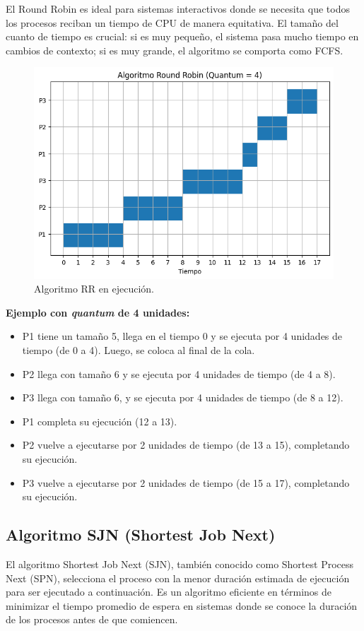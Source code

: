 El Round Robin es ideal para sistemas interactivos donde se necesita que todos los procesos reciban un tiempo de CPU de manera equitativa. El tamaño del cuanto de tiempo es crucial: si es muy pequeño, el sistema pasa mucho tiempo en cambios de contexto; si es muy grande, el algoritmo se comporta como FCFS.
\begin{figure}[H] \centering \includegraphics[width=0.8\linewidth]{Imagenes/rr_ejecucion.png} 
	\caption{Algoritmo RR en ejecución.} 
\end{figure}

\textbf{Ejemplo con \textit{quantum} de 4 unidades:}
\begin{itemize}
	\item 
	P1 tiene un tamaño 5, llega en el tiempo 0 y se ejecuta por 4 unidades de tiempo (de 0 a 4). Luego, se coloca al final de la cola.
	\item 	P2 llega con tamaño 6 y se ejecuta por 4 unidades de tiempo (de 4 a 8).
	\item 	P3 llega con tamaño 6, y se ejecuta por 4 unidades de tiempo (de 8 a 12).
	\item 	
	P1 completa su ejecución (12 a 13).
	\item P2 vuelve a ejecutarse por 2 unidades de tiempo (de 13 a 15), completando su ejecución.
	\item P3 vuelve a ejecutarse por 2 unidades de tiempo (de 15 a 17), completando su ejecución.
	
\end{itemize}

\subsection{Algoritmo SJN (Shortest Job Next)}

El algoritmo Shortest Job Next (SJN), también conocido como Shortest Process Next (SPN), selecciona el proceso con la menor duración estimada de ejecución para ser ejecutado a continuación. Es un algoritmo eficiente en términos de minimizar el tiempo promedio de espera en sistemas donde se conoce la duración de los procesos antes de que comiencen.

